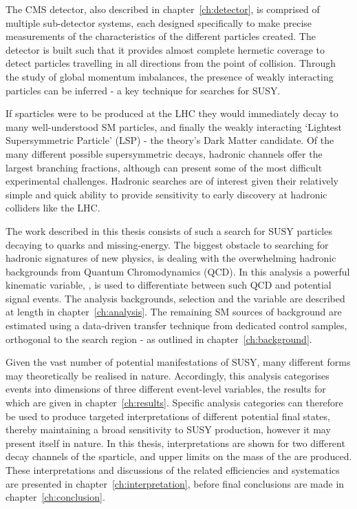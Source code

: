 The CMS detector, also described in chapter~\ref{ch:detector}, is comprised of
multiple sub-detector systems, each designed
specifically to make precise measurements of the characteristics of the
different particles created. The detector is built such that it provides almost
complete hermetic coverage to detect particles travelling in all directions
from the point of collision. Through the study of global momentum imbalances,
the presence of weakly interacting particles can be inferred - a key technique
for searches for SUSY.

If sparticles were to be produced at the LHC they would immediately decay to
many well-understood SM particles, and finally the weakly interacting `Lightest
Supersymmetric Particle' (LSP) - the theory's Dark Matter candidate. Of the many
different possible supersymmetric decays, hadronic channels offer the largest
branching fractions, although can present some of the most difficult
experimental
challenges. Hadronic searches are of interest given their relatively simple and
quick ability to provide sensitivity to early discovery at hadronic colliders
like the LHC.

The work described in this thesis consists of such a search for SUSY particles
decaying to quarks and missing-energy. The biggest obstacle to
searching for hadronic signatures of new physics, is dealing with the
overwhelming hadronic backgrounds from Quantum Chromodynamics (QCD). In this
analysis a powerful kinematic variable, \alphat, is used to differentiate
between such QCD and potential signal events. The analysis backgrounds,
selection and
the \alphat variable are described at length in chapter~\ref{ch:analysis}. The
remaining SM sources of background
are estimated using a data-driven transfer technique from dedicated control
samples, orthogonal to the search region - as outlined in
chapter~\ref{ch:background}.

Given the vast number of potential manifestations of SUSY, many different forms
may theoretically be realised in nature. Accordingly, this analysis
categorises events into dimensions of three different event-level variables,
the results for which are given in chapter~\ref{ch:results}.
Specific analysis categories can therefore be used to produce targeted
interpretations of different potential final states, thereby maintaining a broad
sensitivity to SUSY production, however it may present itself in nature. In this
thesis,
interpretations are shown for two different decay channels of the \sTop
sparticle, and upper limits on the mass of the \sTop are produced. These interpretations
and discussions of the related efficiencies and systematics are presented in
chapter~\ref{ch:interpretation}, before final conclusions are made in
chapter~\ref{ch:conclusion}.

